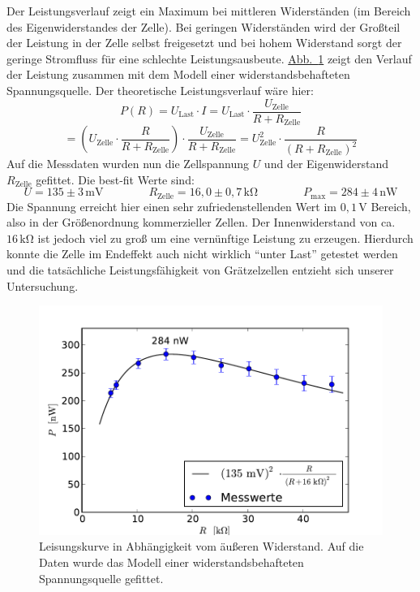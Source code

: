 \documentclass[11pt]{scrartcl}
\newcommand{\unit}[1]{\ensuremath{\,\mathrm{#1}}} %
\begin{document}
Der Leistungsverlauf zeigt ein Maximum bei mittleren Widerständen (im Bereich des Eigenwiderstandes der Zelle). Bei geringen Widerständen wird der Großteil der Leistung in der Zelle selbst freigesetzt und bei hohem Widerstand sorgt der geringe Stromfluss für eine schlechte Leistungsausbeute.
\hyperref[leistungskurve]{Abb.~\ref{leistungskurve}} zeigt den Verlauf der Leistung zusammen mit dem Modell einer widerstandsbehafteten Spannungsquelle. Der theoretische Leistungsverlauf wäre hier:
\[
P(R)= U_{\text{Last}}\cdot I
= U_{\text{Last}}\cdot \frac{U_{\text{Zelle}}}{R+R_{\text{Zelle}}}
\]
\[
= \left(U_{\text{Zelle}}\cdot \frac{R}{R+R_{\text{Zelle}}}\right)\cdot \frac{U_{\text{Zelle}}}{R+R_{\text{Zelle}}}
= U_{\text{Zelle}}^2\cdot \frac{R}{(R+R_{\text{Zelle}})^2}
\]
Auf die Messdaten wurden nun die Zellspannung $U$ und der Eigenwiderstand $R_{\text{Zelle}}$ gefittet. Die best-fit Werte sind:
\[
U = 135 \pm 3\unit{mV}
\qquad\qquad
R_{\text{Zelle}} = 16,0 \pm 0,7\unit{k\Omega}
\qquad\qquad
P_{\text{max}} = 284 \pm 4\unit{nW}
\]
Die Spannung erreicht hier einen sehr zufriedenstellenden Wert im $0,1\unit{V}$ Bereich, also in der Größenordnung kommerzieller Zellen. Der Innenwiderstand von ca. $16\unit{k\Omega}$ ist jedoch viel zu groß um eine vernünftige Leistung zu erzeugen. Hierdurch konnte die Zelle im Endeffekt auch nicht wirklich "`unter Last"' getestet werden und die tatsächliche Leistungsfähigkeit von Grätzelzellen entzieht sich unserer Untersuchung.
\begin{figure}[H]
\begin{center}
\includegraphics[width=1.0\textwidth]{images/graetzel_leistung.pdf}
\end{center}
\vspace{-1.5\baselineskip}
\caption{Leisungskurve in Abhängigkeit vom äußeren Widerstand. Auf die Daten wurde das Modell einer widerstandsbehafteten Spannungsquelle gefittet.}
\label{leistungskurve}
\end{figure}
\end{document}
